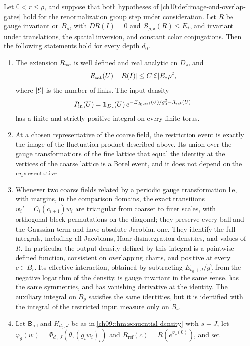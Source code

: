 \begin{theorem}\label{ch10:thm:actual-compact-cut}
Let $0<r\le\rho$, and suppose that both hypotheses of \cref{ch10:def:image-and-overlap-gates} hold for the renormalization group step under consideration. Let $R$ be gauge invariant on $B_\rho$, with $DR(I)=0$ and $\mathcal B_{\rho,a}(R)\le E_*$, and invariant under translations, the spatial inversion, and constant color conjugations. Then the following statements hold for every depth $d_0$.
\begin{enumerate}
\item The extension $R_{\mathrm{sat}}$ is well defined and real analytic on $D_\rho$, and
\[
 \lvert R_{\mathrm{sat}}(U)-R(I)\rvert\le C\lvert \mathcal E\rvert E_*\rho^2,
\]
where $\lvert \mathcal E\rvert$ is the number of links. The input density
\[
 P_{\mathrm{in}}(U)=\mathbf 1_{D_r}(U)\,e^{-E_{d_0,\mathrm{sat}}(U)/g_0^2-R_{\mathrm{sat}}(U)}
\]
has a finite and strictly positive integral on every finite torus.
\item At a chosen representative of the coarse field, the restriction event is exactly the image of the fluctuation product described above. Its union over the gauge transformations of the fine lattice that equal the identity at the vertices of the coarse lattice is a Borel event, and it does not depend on the representative.
\item Whenever two coarse fields related by a periodic gauge transformation lie, with margins, in the comparison domains, the exact transitions $w_i'=O_i(c_{i+1})w_i$ are triangular from coarser to finer scales, with orthogonal block permutations on the diagonal; they preserve every ball and the Gaussian term and have absolute Jacobian one. They identify the full integrals, including all Jacobians, Haar disintegration densities, and values of $R$. In particular the output density defined by this integral is a pointwise defined function, consistent on overlapping charts, and positive at every $c\in B_r$. Its effective interaction, obtained by subtracting $E_{d_0+J}/g_J^2$ from the negative logarithm of the density, is gauge invariant in the same sense, has the same symmetries, and has vanishing derivative at the identity. The auxiliary integral on $B_\rho$ satisfies the same identities, but it is identified with the integral of the restricted input measure only on $B_r$.
\item Let $\mathsf B_{\mathrm{ref}}$ and $H_{d_0,J}$ be as in \cref{ch09:thm:sequential-density} with $s=J$, let $\varphi_\theta(w)=\Phi_{d_0,J}(\theta,(g_iw_i)_i)$ and $R_{\mathrm{ref}}(c)=R(e^{\varphi_\theta(0)})$, and set

\end{enumerate}
\end{theorem}
